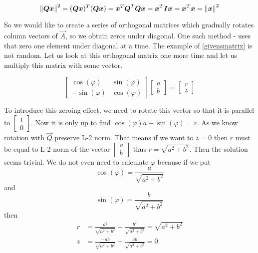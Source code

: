 \begin{equation}
    \left\lVert\boldsymbol{Q}\boldsymbol{x}\right\rVert^2 = (\boldsymbol{Q}\boldsymbol{x})^T (\boldsymbol{Q}\boldsymbol{x}) = \boldsymbol{x}^T\boldsymbol{Q}^T\boldsymbol{Q}\boldsymbol{x} = 
    \boldsymbol{x}^T\boldsymbol{I}\boldsymbol{x} = \boldsymbol{x}^T\boldsymbol{x} = \left\lVert\boldsymbol{x}\right\rVert^2
\end{equation}

So we would like to create a series of orthogonal matrices which gradually rotates column vectors of $\vec{A}$, so we obtain zeros under diagonal. One such method -  uses  that zero one element under diagonal at a time.
The example of \ref{givensmatrix} is not random. Let us look at this orthogonal matrix one more time and let us multiply this matrix with some vector.

\begin{equation}
    \begin{bmatrix} 
        \cos(\varphi) & \sin(\varphi) \\
        - \sin(\varphi) & \cos(\varphi)
        \end{bmatrix}
        \begin{bmatrix} 
            a \\
            b
            \end{bmatrix} = 
            \begin{bmatrix} 
                r \\
                z
                \end{bmatrix}
\end{equation}

To introduce this zeroing effect, we need to rotate this vector so that it is parallel to $
\begin{bmatrix} 
    1 \\
    0
\end{bmatrix}
$. Now it is only up to find  $\cos(\varphi) a + \sin(\varphi) = r $.
As we know rotation with $\vec{Q}$ preserve L-2 norm. That means if we want to $z = 0$  then $r$ must be equal to L-2 norm of the vector  
$
\begin{bmatrix} 
    a \\
    b
\end{bmatrix}
$  thus $r = \sqrt{a^2 + b^2}$. 
Then the solution seems trivial. We do not even need to calculate $\varphi$ because if we put
\begin{equation} \label{givens_cos}
    \cos(\varphi) = \frac{a}{\sqrt{a^2 + b^2}} 
\end{equation}
and   
\begin{equation} \label{givens_sin}
    \sin(\varphi) = \frac{b}{\sqrt{a^2 + b^2}} 
\end{equation}
then 
\begin{align}
    r &= \frac{a^2}{\sqrt{a^2 + b^2}} + \frac{b^2}{\sqrt{a^2 + b^2}} = \sqrt{a^2 + b^2} \\
    z &= \frac{-ab}{\sqrt{a^2 + b^2}} +  \frac{ab}{\sqrt{a^2 + b^2}} = 0.
\end{align}

